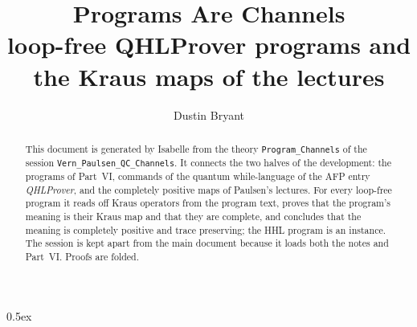 \documentclass[11pt,a4paper]{article}
\begin{document}
\title{Programs Are Channels\\[0.5em]
  \large loop-free QHLProver programs and the Kraus maps of the lectures}
\author{Dustin Bryant}
\maketitle

\begin{abstract}
This document is generated by Isabelle from the theory \texttt{Program\_Channels} of the session
\texttt{Vern\_Paulsen\_QC\_Channels}.  It connects the two halves of the development: the programs
of Part~VI, commands of the quantum while-language of the AFP entry \emph{QHLProver}, and the
completely positive maps of Paulsen's lectures.  For every loop-free program it reads off Kraus
operators from the program text, proves that the program's meaning is their Kraus map and that
they are complete, and concludes that the meaning is completely positive and trace preserving;
the HHL program is an instance.  The session is kept apart from the main document because it
loads both the notes and Part~VI.  Proofs are folded.
\end{abstract}

\parindent 0pt\parskip 0.5ex


\end{document}
